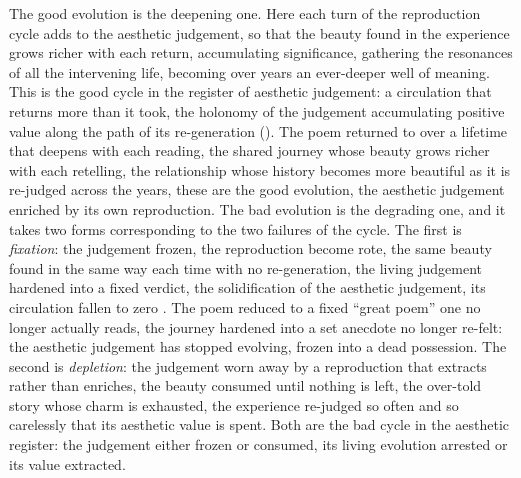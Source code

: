 The good evolution is the deepening one. Here each turn of the reproduction cycle adds to the aesthetic judgement, so that the beauty found in the experience grows richer with each return, accumulating significance, gathering the resonances of all the intervening life, becoming over years an ever-deeper well of meaning. This is the good cycle in the register of aesthetic judgement: a circulation that returns more than it took, the holonomy of the judgement accumulating positive value along the path of its re-generation (). The poem returned to over a lifetime that deepens with each reading, the shared journey whose beauty grows richer with each retelling, the relationship whose history becomes more beautiful as it is re-judged across the years, these are the good evolution, the aesthetic judgement enriched by its own reproduction. The bad evolution is the degrading one, and it takes two forms corresponding to the two failures of the cycle. The first is \emph{fixation}: the judgement frozen, the reproduction become rote, the same beauty found in the same way each time with no re-generation, the living judgement hardened into a fixed verdict, the solidification of the aesthetic judgement, its circulation fallen to zero \parencite{wan2026braid}. The poem reduced to a fixed ``great poem'' one no longer actually reads, the journey hardened into a set anecdote no longer re-felt: the aesthetic judgement has stopped evolving, frozen into a dead possession. The second is \emph{depletion}: the judgement worn away by a reproduction that extracts rather than enriches, the beauty consumed until nothing is left, the over-told story whose charm is exhausted, the experience re-judged so often and so carelessly that its aesthetic value is spent. Both are the bad cycle in the aesthetic register: the judgement either frozen or consumed, its living evolution arrested or its value extracted.

